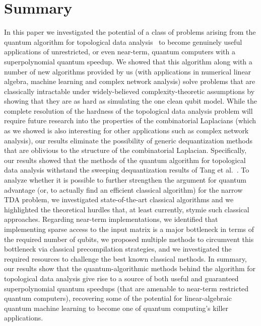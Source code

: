 \documentclass[a4paper, onecolumn, accepted=2022-08-28]{quantumarticle}
\begin{document}
\section{Summary
  \label{sec:summary}}

In this paper we investigated the potential of a class of problems arising from the quantum algorithm for topological data analysis~\cite{lloyd:lgz_algorithm} to become genuinely useful applications of unrestricted, or even near-term, quantum computers with a superpolynomial quantum speedup. 
We showed that this algorithm along with a number of new algorithms provided by us (with applications in numerical linear algebra, machine learning and complex network analysis) solve problems that are classically intractable under widely-believed complexity-theoretic assumptions by showing that they are as hard as simulating the one clean qubit model.
While the complete resolution of the hardness of the topological data analysis problem will require future research into the properties of the combinatorial Laplacians (which as we showed is also interesting for other applications such as complex network analysis), our results eliminate the possibility of generic dequantization methods that are oblivious to the structure of the combinatorial Laplacian.
Specifically, our results showed that the methods of the quantum algorithm for topological data analysis withstand the sweeping dequantization results of Tang et al.~\cite{tang:dequantization, chia:dequantizations}.
To  analyze whether  it  is  possible  to  further  strengthen  the  argument for quantum advantage (or, to actually find an efficient classical algorithm) for the narrow TDA problem, we investigated state-of-the-art  classical algorithms and  we highlighted the theoretical hurdles that, at least currently, stymie such classical approaches.
Regarding near-term implementations, we identified that implementing sparse access to the input matrix is a major bottleneck in terms of the required number of qubits, we proposed multiple methods to circumvent this bottleneck via classical precompilation strategies, and we investigated the required resources to challenge the best known classical methods.
In summary, our results show that the quantum-algorithmic methods behind the algorithm for topological data analysis give rise to a source of both useful and guaranteed superpolynomial quantum speedups (that are amenable to near-term restricted quantum computers), recovering some of the potential for linear-algebraic quantum machine learning to become one of quantum computing's killer applications.
\end{document}
